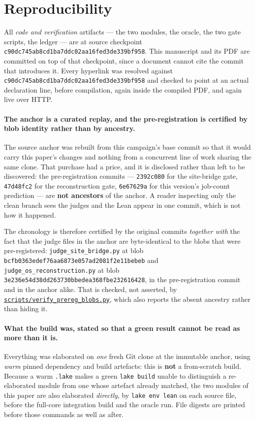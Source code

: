 \documentclass[11pt]{article}
\theoremstyle{definition}
\newcommand{\anchor}{c90dc745ab8cd1ba7ddc02aa16fed3de339bf958}
\newcommand{\repofile}[2]{%
  \href{https://github.com/lluiseriksson/THE-ERIKSSON-PROGRAMME/blob/\anchor/#1}{\nolinkurl{#2}}}
\begin{document}
\section{Reproducibility}\label{sec:repro}

All \emph{code and verification} artifacts --- the two modules, the oracle, the
two gate scripts, the ledger --- are at source checkpoint \texttt{\anchor}.
This manuscript and its PDF are committed on top of that checkpoint, since a
document cannot cite the commit that introduces it.  Every hyperlink was
resolved against \texttt{\anchor} and checked to point at an actual declaration
line, before compilation, again inside the compiled PDF, and again live over
HTTP.

\paragraph{The anchor is a curated replay, and the pre-registration is
certified by blob identity rather than by ancestry.}  The source anchor was
rebuilt from this campaign's base commit so that it would carry this paper's
changes and nothing from a concurrent line of work sharing the same clone.  That
purchase had a price, and it is disclosed rather than left to be discovered: the
pre-registration commits --- \texttt{2392c080} for the site-bridge gate,
\texttt{47d48fc2} for the reconstruction gate, \texttt{6e67629a} for this
version's job-count prediction --- are \textbf{not ancestors} of the anchor.  A
reader inspecting only the clean branch sees the judges and the Lean appear in
one commit, which is not how it happened.

The chronology is therefore certified by the original commits \emph{together
with} the fact that the judge files in the anchor are byte-identical to the
blobs that were pre-registered:
\texttt{judge\_site\_bridge.py} at blob
\texttt{bcfb0363edef76aa6873e057ad2081f2e11bebeb} and
\texttt{judge\_os\_reconstruction.py} at blob
\texttt{3e236e54d38dd263730bbedea368fbe232616428}, in the pre-registration
commit and in the anchor alike.  That is checked, not asserted, by
\repofile{scripts/verify\_prereg\_blobs.py}{scripts/verify\_prereg\_blobs.py},
which also reports the absent ancestry rather than hiding it.

\paragraph{What the build was, stated so that a green result cannot be read as
more than it is.}  Everything was elaborated on \emph{one} fresh Git clone at
the immutable anchor, using \emph{warm} pinned dependency and build artefacts:
this is \textbf{not} a from-scratch build.  Because a warm \texttt{.lake} makes
a green \texttt{lake build} unable to distinguish a re-elaborated module from
one whose artefact already matched, the two modules of this paper are also
elaborated \emph{directly}, by \texttt{lake env lean} on each source file,
before the full-core integration build and the oracle run.  File digests are
printed before those commands as well as after.
\end{document}
